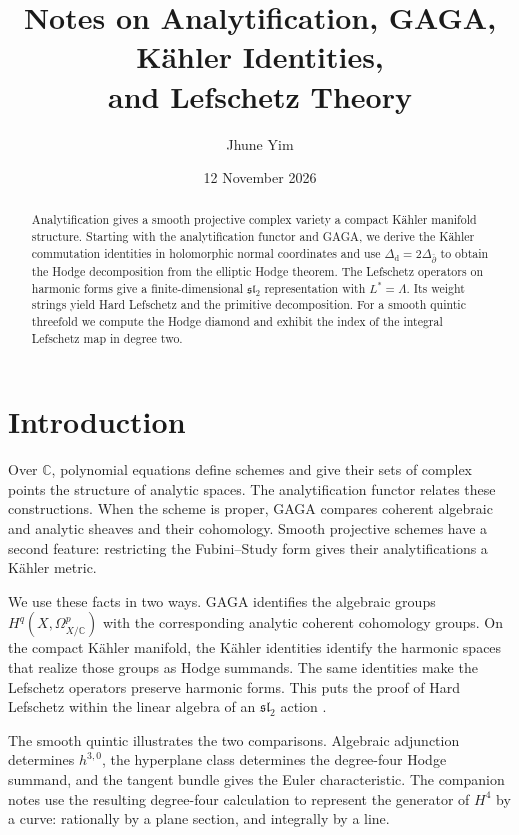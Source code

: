 \documentclass[11pt,reqno]{amsart}
\title[Analytification, GAGA, and Lefschetz Theory]
{Notes on Analytification, GAGA, K\"ahler Identities,\\
  and Lefschetz Theory}
\author{Jhune Yim}
\date{12 November 2026}
\theoremstyle{definition}
\theoremstyle{remark}
\newcommand{\C}{\mathbb{C}}
\newcommand{\dd}{\mathrm{d}}
\newcommand{\dbar}{\bar\partial}
\begin{document}
\raggedbottom

\begin{abstract}
Analytification gives a smooth projective complex variety a compact K\"ahler
manifold structure. Starting with the analytification functor and GAGA, we
derive the K\"ahler commutation identities in holomorphic normal coordinates
and use $\Delta_{\dd}=2\Delta_{\dbar}$ to obtain the Hodge decomposition
from the elliptic Hodge theorem. The Lefschetz operators on harmonic forms
give a finite-dimensional $\mathfrak{sl}_2$ representation with
$L^*=\Lambda$. Its weight strings yield Hard Lefschetz and the primitive
decomposition. For a smooth quintic threefold we compute the Hodge diamond
and exhibit the index of the integral Lefschetz map in degree two.
\end{abstract}

\maketitle

\setcounter{tocdepth}{1}
\tableofcontents

\section{Introduction}
\label{sec:intro}

Over $\C$, polynomial equations define schemes and give their sets of complex
points the structure of analytic spaces. The analytification functor relates
these constructions. When the scheme is proper, GAGA compares coherent
algebraic and analytic sheaves and their cohomology. Smooth projective schemes
have a second feature: restricting the Fubini--Study form gives their
analytifications a K\"ahler metric.

We use these facts in two ways. GAGA identifies the algebraic groups
$H^q(X,\Omega^p_{X/\C})$ with the corresponding analytic coherent cohomology
groups. On the compact K\"ahler manifold, the K\"ahler identities identify
the harmonic spaces that realize those groups as Hodge summands. The same
identities make the Lefschetz operators preserve harmonic forms. This puts the
proof of Hard Lefschetz within the linear algebra of an $\mathfrak{sl}_2$ action
\cite{griffithsharris1978,voisin2002hodge,huybrechts2005complex}.

The smooth quintic illustrates the two comparisons. Algebraic adjunction
determines $h^{3,0}$, the hyperplane class determines the degree-four Hodge
summand, and the tangent bundle gives the Euler characteristic. The companion
notes \cite{hodgenotes} use the resulting degree-four calculation to
represent the generator of $H^4$ by a curve: rationally by a plane section,
and integrally by a line.
\end{document}

